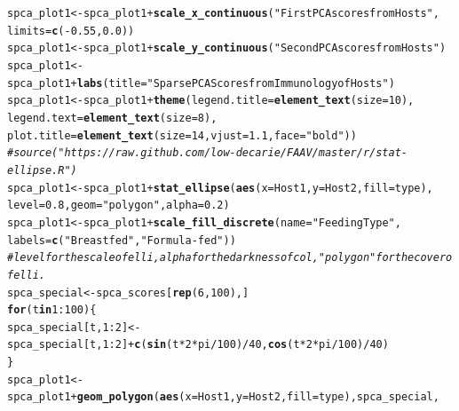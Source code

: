 \documentclass[12pt]{article}\usepackage[]{graphicx}\usepackage[]{color}
\makeatletter
\newcommand{\hlnum}[1]{\textcolor[rgb]{0.686,0.059,0.569}{#1}}%
\newcommand{\hlstr}[1]{\textcolor[rgb]{0.192,0.494,0.8}{#1}}%
\newcommand{\hlcom}[1]{\textcolor[rgb]{0.678,0.584,0.686}{\textit{#1}}}%
\newcommand{\hlopt}[1]{\textcolor[rgb]{0,0,0}{#1}}%
\newcommand{\hlstd}[1]{\textcolor[rgb]{0.345,0.345,0.345}{#1}}%
\newcommand{\hlkwa}[1]{\textcolor[rgb]{0.161,0.373,0.58}{\textbf{#1}}}%
\newcommand{\hlkwb}[1]{\textcolor[rgb]{0.69,0.353,0.396}{#1}}%
\newcommand{\hlkwc}[1]{\textcolor[rgb]{0.333,0.667,0.333}{#1}}%
\newcommand{\hlkwd}[1]{\textcolor[rgb]{0.737,0.353,0.396}{\textbf{#1}}}%
\newenvironment{kframe}{%
 \def\at@end@of@kframe{}%
 \ifinner\ifhmode%
  \def\at@end@of@kframe{\end{minipage}}%
  \begin{minipage}{\columnwidth}%
 \fi\fi%
 \def\FrameCommand##1{\hskip\@totalleftmargin \hskip-\fboxsep
 \colorbox{shadecolor}{##1}\hskip-\fboxsep
     \hskip-\linewidth \hskip-\@totalleftmargin \hskip\columnwidth}%
 \MakeFramed {\advance\hsize-\width
   \@totalleftmargin\z@ \linewidth\hsize
   \@setminipage}}%
 {\par\unskip\endMakeFramed%
 \at@end@of@kframe}
\newenvironment{knitrout}{}{} %
\makeatother
\begin{document}
\begin{knitrout}
\begin{kframe}
\begin{alltt}
\hlstd{spca_plot1}\hlkwb{<-}\hlstd{spca_plot1}\hlopt{+}\hlkwd{scale_x_continuous}\hlstd{(}\hlstr{"First PCA scores from Hosts"}\hlstd{,}
                                          \hlkwc{limits}\hlstd{=}\hlkwd{c}\hlstd{(}\hlopt{-}\hlnum{0.55}\hlstd{,}\hlnum{0.0}\hlstd{))}
\hlstd{spca_plot1}\hlkwb{<-}\hlstd{spca_plot1}\hlopt{+}\hlkwd{scale_y_continuous}\hlstd{(}\hlstr{"Second PCA scores from Hosts"}\hlstd{)}
\hlstd{spca_plot1}\hlkwb{<-}\hlstd{spca_plot1}\hlopt{+}\hlkwd{labs}\hlstd{(}\hlkwc{title}\hlstd{=}\hlstr{"Sparse PCA Scores from Immunology of Hosts"}\hlstd{)}
\hlstd{spca_plot1}\hlkwb{<-}\hlstd{spca_plot1}\hlopt{+}\hlkwd{theme}\hlstd{(}\hlkwc{legend.title}\hlstd{=}\hlkwd{element_text}\hlstd{(}\hlkwc{size}\hlstd{=}\hlnum{10}\hlstd{),}
                             \hlkwc{legend.text}\hlstd{=}\hlkwd{element_text}\hlstd{(}\hlkwc{size}\hlstd{=}\hlnum{8}\hlstd{),}
                             \hlkwc{plot.title}\hlstd{=}\hlkwd{element_text}\hlstd{(}\hlkwc{size}\hlstd{=}\hlnum{14}\hlstd{,}\hlkwc{vjust}\hlstd{=}\hlnum{1.1}\hlstd{,}\hlkwc{face}\hlstd{=}\hlstr{"bold"}\hlstd{))}
\hlcom{#source("https://raw.github.com/low-decarie/FAAV/master/r/stat-ellipse.R")}
\hlstd{spca_plot1}\hlkwb{<-}\hlstd{spca_plot1}\hlopt{+}\hlkwd{stat_ellipse}\hlstd{(}\hlkwd{aes}\hlstd{(}\hlkwc{x}\hlstd{=Host1,}\hlkwc{y}\hlstd{=Host2,}\hlkwc{fill}\hlstd{=type),}
                                    \hlkwc{level}\hlstd{=}\hlnum{0.8}\hlstd{,}\hlkwc{geom}\hlstd{=}\hlstr{"polygon"}\hlstd{,}\hlkwc{alpha}\hlstd{=}\hlnum{0.2}\hlstd{)}
\hlstd{spca_plot1}\hlkwb{<-}\hlstd{spca_plot1}\hlopt{+}\hlkwd{scale_fill_discrete}\hlstd{(}\hlkwc{name}\hlstd{=}\hlstr{"Feeding Type"}\hlstd{,}
                                            \hlkwc{labels}\hlstd{=}\hlkwd{c}\hlstd{(}\hlstr{"Breastfed"}\hlstd{,}\hlstr{"Formula-fed"}\hlstd{))}
\hlcom{#level for the scale of elli, alpha for the darkness of col,"polygon" for the cover of elli.}
\hlstd{spca_special}\hlkwb{<-}\hlstd{spca_scores[}\hlkwd{rep}\hlstd{(}\hlnum{6}\hlstd{,}\hlnum{100}\hlstd{),]}
\hlkwa{for}\hlstd{(t} \hlkwa{in} \hlnum{1}\hlopt{:}\hlnum{100}\hlstd{)\{}
 \hlstd{spca_special[t,}\hlnum{1}\hlopt{:}\hlnum{2}\hlstd{]}\hlkwb{<-}\hlstd{spca_special[t,}\hlnum{1}\hlopt{:}\hlnum{2}\hlstd{]}\hlopt{+}\hlkwd{c}\hlstd{(}\hlkwd{sin}\hlstd{(t}\hlopt{*}\hlnum{2}\hlopt{*}\hlstd{pi}\hlopt{/}\hlnum{100}\hlstd{)}\hlopt{/}\hlnum{40}\hlstd{,}\hlkwd{cos}\hlstd{(t}\hlopt{*}\hlnum{2}\hlopt{*}\hlstd{pi}\hlopt{/}\hlnum{100}\hlstd{)}\hlopt{/}\hlnum{40}\hlstd{)}
\hlstd{\}}
\hlstd{spca_plot1}\hlkwb{<-}\hlstd{spca_plot1}\hlopt{+}\hlkwd{geom_polygon}\hlstd{(}\hlkwd{aes}\hlstd{(}\hlkwc{x}\hlstd{=Host1,}\hlkwc{y}\hlstd{=Host2,}\hlkwc{fill}\hlstd{=type),spca_special,}

\end{alltt}
\end{kframe}
\end{knitrout}
\end{document}
